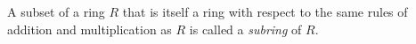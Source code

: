 A subset of a ring $R$ that is itself a ring with respect to the same rules of addition and multiplication as $R$ is called a \emph{subring} of $R$.
